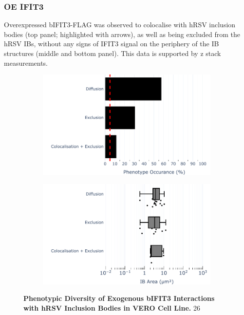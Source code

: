 \subsubsection{OE IFIT3}
Overexpressed bIFIT3-FLAG was observed to colocalise with hRSV inclusion bodies (top panel; highlighted with arrows), as well as being excluded from the hRSV IBs, without any signs of IFIT3 signal on the periphery of the IB structures (middle and bottom panel). This data is supported by z stack measurements.

\begin{figure}
    \begin{subfigure}{0.495\textwidth}
        \caption{}
        \includegraphics[width=1\linewidth]{09. Chapter 4/Figs/04. Overexpression/02. IFIT3/01. bar_i3_hrsv.pdf} 
    \end{subfigure}
    \begin{subfigure}{0.495\textwidth}
        \caption{}
        \includegraphics[width=1\linewidth]{09. Chapter 4/Figs/04. Overexpression/02. IFIT3/02. box_i3_hrsv.pdf}
    \end{subfigure}
    \caption[Phenotypic Diversity of Exogenous bIFIT3 Interactions with hRSV Inclusion Bodies in VERO Cell Line.]{\textbf{Phenotypic Diversity of Exogenous bIFIT3 Interactions with hRSV Inclusion Bodies in VERO Cell Line.} 26}
    \label{fig:Phenotypic Diversity of Exogenous bIFIT3 Interactions with hRSV Inclusion Bodies in VERO Cell Line}
\end{figure}

